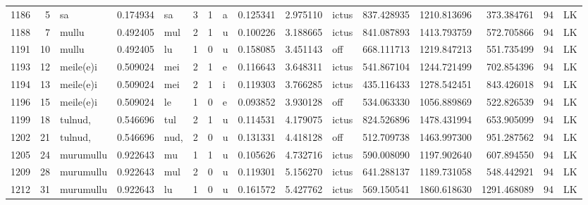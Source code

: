 \begin{tabular}{lrlrllllrrlrrrll}
1186 &           5 &               sa &  0.174934 &      sa &        3 &      1 &       a &      0.125341 &      2.975110 &  ictus &   837.428935 &  1210.813696 &   373.384761 &     94 &        LK \\
1188 &           7 &            mullu &  0.492405 &     mul &        2 &      1 &       u &      0.100226 &      3.188665 &  ictus &   841.087893 &  1413.793759 &   572.705866 &     94 &        LK \\
1191 &          10 &            mullu &  0.492405 &      lu &        1 &      0 &       u &      0.158085 &      3.451143 &    off &   668.111713 &  1219.847213 &   551.735499 &     94 &        LK \\
1193 &          12 &        meile(e)i &  0.509024 &     mei &        2 &      1 &       e &      0.116643 &      3.648311 &  ictus &   541.867104 &  1244.721499 &   702.854396 &     94 &        LK \\
1194 &          13 &        meile(e)i &  0.509024 &     mei &        2 &      1 &       i &      0.119303 &      3.766285 &  ictus &   435.116433 &  1278.542451 &   843.426018 &     94 &        LK \\
1196 &          15 &        meile(e)i &  0.509024 &      le &        1 &      0 &       e &      0.093852 &      3.930128 &    off &   534.063330 &  1056.889869 &   522.826539 &     94 &        LK \\
1199 &          18 &          tulnud, &  0.546696 &     tul &        2 &      1 &       u &      0.114531 &      4.179075 &  ictus &   824.526896 &  1478.431994 &   653.905099 &     94 &        LK \\
1202 &          21 &          tulnud, &  0.546696 &    nud, &        2 &      0 &       u &      0.131331 &      4.418128 &    off &   512.709738 &  1463.997300 &   951.287562 &     94 &        LK \\
1205 &          24 &        murumullu &  0.922643 &      mu &        1 &      1 &       u &      0.105626 &      4.732716 &  ictus &   590.008090 &  1197.902640 &   607.894550 &     94 &        LK \\
1209 &          28 &        murumullu &  0.922643 &     mul &        2 &      0 &       u &      0.119301 &      5.156270 &  ictus &   641.288137 &  1189.731058 &   548.442921 &     94 &        LK \\
1212 &          31 &        murumullu &  0.922643 &      lu &        1 &      0 &       u &      0.161572 &      5.427762 &  ictus &   569.150541 &  1860.618630 &  1291.468089 &     94 &        LK \\

\end{tabular}
